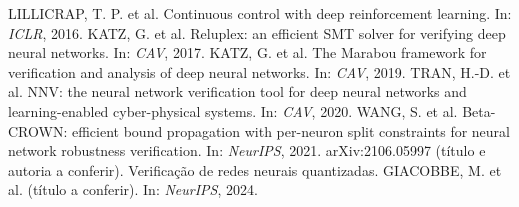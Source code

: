  LILLICRAP, T. P. et al. Continuous control with deep reinforcement learning. In: \emph{ICLR}, 2016.
 KATZ, G. et al. Reluplex: an efficient SMT solver for verifying deep neural networks. In: \emph{CAV}, 2017.
 KATZ, G. et al. The Marabou framework for verification and analysis of deep neural networks. In: \emph{CAV}, 2019.
 TRAN, H.-D. et al. NNV: the neural network verification tool for deep neural networks and learning-enabled cyber-physical systems. In: \emph{CAV}, 2020.
 WANG, S. et al. Beta-CROWN: efficient bound propagation with per-neuron split constraints for neural network robustness verification. In: \emph{NeurIPS}, 2021.
 arXiv:2106.05997 (título e autoria a conferir). Verificação de redes neurais quantizadas.
 GIACOBBE, M. et al. (título a conferir). In: \emph{NeurIPS}, 2024.
